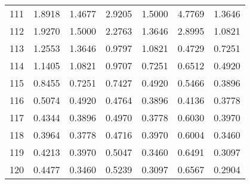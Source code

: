 \begin{center}
\begin{longtable}{lcccccc}
    111&1.8918&1.4677&2.9205&1.5000&4.7769&1.3646 \\
    112&1.9270&1.5000&2.2763&1.3646&2.8995&1.0821 \\
    113&1.2553&1.3646&0.9797&1.0821&0.4729&0.7251 \\
    114&1.1405&1.0821&0.9707&0.7251&0.6512&0.4920 \\
    115&0.8455&0.7251&0.7427&0.4920&0.5466&0.3896 \\
    116&0.5074&0.4920&0.4764&0.3896&0.4136&0.3778 \\
    117&0.4344&0.3896&0.4970&0.3778&0.6030&0.3970 \\
    118&0.3964&0.3778&0.4716&0.3970&0.6004&0.3460 \\
    119&0.4213&0.3970&0.5047&0.3460&0.6491&0.3097 \\
    120&0.4477&0.3460&0.5239&0.3097&0.6567&0.2904 \\
\end{longtable}
\end{center}


